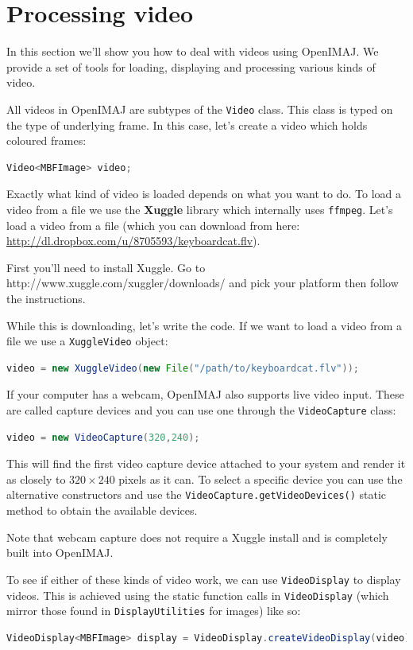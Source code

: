 \chapter{Processing video}
In this section we'll show you how to deal with videos using OpenIMAJ. We provide a 
set of tools for loading, displaying and processing various kinds of video. 

All videos in OpenIMAJ are subtypes of the \verb+Video+ class. This class is typed 
on the type of underlying frame. In this case, let's create a video which holds coloured frames:
\begin{lstlisting}[language=java]
Video<MBFImage> video;
\end{lstlisting}

Exactly what kind of video is loaded depends on what you want to do. To load a video from a file
we use the \textbf{Xuggle} library which internally uses \verb+ffmpeg+. Let's load a video 
from a file (which you can download from here: \url{http://dl.dropbox.com/u/8705593/keyboardcat.flv}).

First you'll need to install Xuggle. Go to http://www.xuggle.com/xuggler/downloads/ and pick your platform 
then follow the instructions.

While this is downloading, let's write the code.
If we want to load a video from a file we use a \verb+XuggleVideo+ object: 
\begin{lstlisting}[language=java]
video = new XuggleVideo(new File("/path/to/keyboardcat.flv"));
\end{lstlisting}

If your computer has a webcam, OpenIMAJ also supports live video input. These are called capture 
devices and you can use one through the \verb+VideoCapture+ class:
\begin{lstlisting}[language=java]
video = new VideoCapture(320,240);
\end{lstlisting}
This will find the first video capture device attached to your system and render it as closely to 
$320\times240$ pixels as it can. To select a specific device you can use the alternative constructors
and use the \verb+VideoCapture.getVideoDevices()+ static method to obtain the available devices.

Note that webcam capture does not require a Xuggle install and is completely built into OpenIMAJ.

To see if either of these kinds of video work, we can use \verb+VideoDisplay+ to display videos. This is 
achieved using the static function calls in \verb+VideoDisplay+ (which mirror those found in 
\verb+DisplayUtilities+ for images) like so:
\begin{lstlisting}[language=java]
VideoDisplay<MBFImage> display = VideoDisplay.createVideoDisplay(video);
\end{lstlisting}

